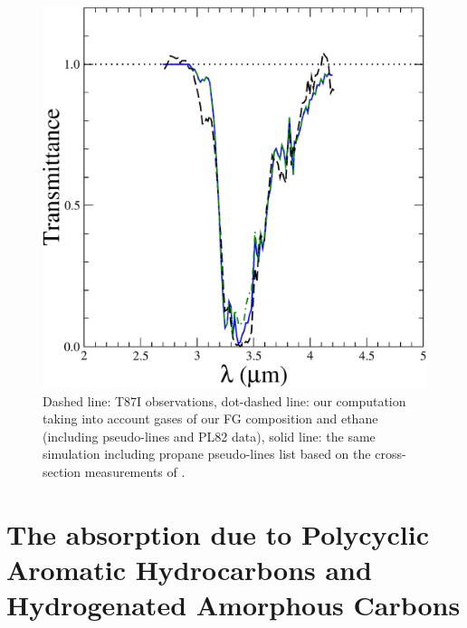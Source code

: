 \documentclass{arxiv-icarus}
\begin{document}
\begin{figure}[!ht]
    \includegraphics[width=.8\linewidth]{Fig_7}
    \caption{Dashed line: T87I observations, dot-dashed line: our computation taking into account gases of our FG
    composition and ethane (including pseudo-lines and PL82 data), solid line: the same simulation including propane pseudo-lines list based on the cross-section measurements of \cite{Harrison2010a}.}
    \label{fig:FGethaprop}
\end{figure}


\section{The absorption due to Polycyclic Aromatic Hydrocarbons and Hydrogenated Amorphous Carbons}
\label{pah}
\end{document}
